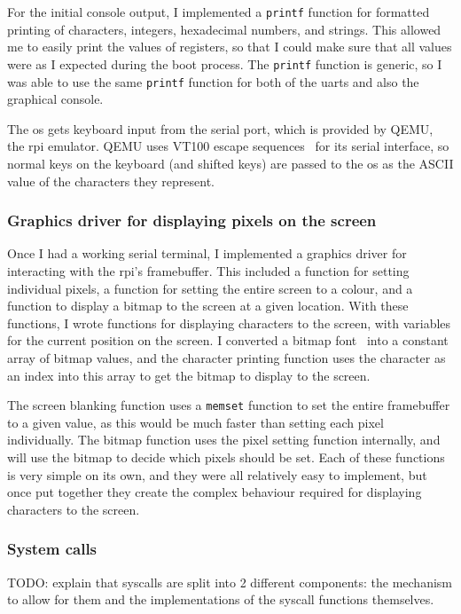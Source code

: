 \documentclass{article}
\begin{document}
For the initial console output, I implemented a \texttt{printf} function for
formatted printing of characters, integers, hexadecimal numbers, and strings.
This allowed me to easily print the values of registers, so that I could make
sure that all values were as I expected during the boot process. The
\texttt{printf} function is generic, so I was able to use the same
\texttt{printf} function for both of the \glspl{uart} and also the graphical
console.

The \gls{os} gets keyboard input from the serial port, which is provided by
QEMU, the \gls{rpi} emulator. QEMU uses VT100 escape sequences~\cite{vt100} for
its serial interface, so normal keys on the keyboard (and shifted keys) are
passed to the \gls{os} as the ASCII value of the characters they represent.

\subsubsection{Graphics driver for displaying pixels on the screen}
\label{sec:design_graphics_driver}
Once I had a working serial terminal, I implemented a graphics driver for
interacting with the \gls{rpi}'s framebuffer. This included a function for
setting individual pixels, a function for setting the entire screen to a
colour, and a function to display a bitmap to the screen at a given location.
With these functions, I wrote functions for displaying characters to the
screen, with variables for the current position on the screen. I converted a
bitmap font~\cite{bizcat-font} into a constant array of bitmap values, and the
character printing function uses the character as an index into this array to
get the bitmap to display to the screen.

The screen blanking function uses a \texttt{memset} function to set the entire
framebuffer to a given value, as this would be much faster than setting each
pixel individually. The bitmap function uses the pixel setting function
internally, and will use the bitmap to decide which pixels should be set. Each
of these functions is very simple on its own, and they were all relatively easy
to implement, but once put together they create the complex behaviour required
for displaying characters to the screen.

\subsubsection{System calls}
TODO: explain that syscalls are split into 2 different components: the
mechanism to allow for them and the implementations of the syscall functions
themselves.
\end{document}
